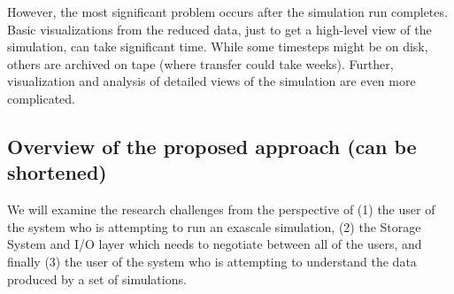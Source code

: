 However, the most significant problem occurs after the simulation run completes. Basic visualizations from the reduced data, just to get a high-level view of the simulation, can take significant time. While some timesteps might be on disk, others are archived on tape (where transfer could take weeks). Further, visualization and analysis of detailed views of the simulation are even more complicated.


\subsection{Overview of the proposed approach (can be shortened)} 


We will examine the research challenges from the perspective of
%
(1) the user of the system who is attempting to run an exascale simulation,
%
(2) the Storage System and I/O layer which needs to negotiate between all of
the users, and finally
%
(3) the user of the system who is attempting to understand the data
produced by a set of simulations.

